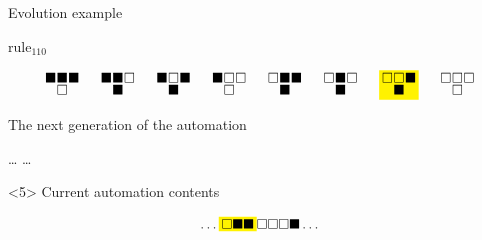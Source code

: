 \documentclass[presentation,aspectratio=169,smaller]{beamer}
\begin{document}
\begin{frame}[label={sec:org812e2ea},t]{Evolution example}
\begin{onlyenv}
\(\text{rule}_{110}\)

\begin{equation*}
  \begingroup
  \setlength\arraycolsep{0.25pt}
  \renewcommand{\arraystretch}{0.5}
  \begin{matrix}
    \blacksquare & \blacksquare & \blacksquare \\
    & \square &
  \end{matrix}\mspace{28mu}
  \begin{matrix}
    \blacksquare & \blacksquare & \square \\
    & \blacksquare &
  \end{matrix}\mspace{28mu}
  \begin{matrix}
    \blacksquare & \square & \blacksquare \\
    & \blacksquare &
  \end{matrix}\mspace{28mu}
  \begin{matrix}
    \blacksquare & \square & \square \\
    & \square &
  \end{matrix}\mspace{28mu}
  \begin{matrix}
    \square & \blacksquare & \blacksquare \\
    & \blacksquare &
  \end{matrix}\mspace{28mu}
  \begin{matrix}
    \square & \blacksquare & \square \\
    & \blacksquare &
  \end{matrix}\mspace{28mu}
  \mathcolorbox{yellow}{
    \begin{matrix}
      \square & \square & \blacksquare \\
      & \blacksquare &
    \end{matrix}
  }\mspace{28mu}
  \begin{matrix}
    \square & \square & \square \\
    & \square &
  \end{matrix}
  \endgroup
\end{equation*}

The next generation of the automation

\hfill \dots
{}
\mspace{14mu}
\mspace{14mu}
\mspace{14mu}
\mspace{14mu}
\mspace{14mu}
\mspace{14mu}
\dots \hfill
\end{onlyenv}

\begin{onlyenv}<5>
Current automation contents

\begin{equation*}
  \hfill
  \dots
  \mathcolorbox{yellow}{
    \square
    \blacksquare
    \blacksquare
  }
  \square
  \square
  \square
  \blacksquare
  \dots
  \hfill
\end{equation*}


\end{onlyenv}
\end{frame}
\end{document}
